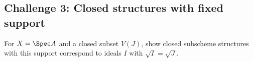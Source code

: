 \subsection*{Challenge 3: Closed structures with fixed support}
\begin{problem}\label{chal:vi22-03}
For $X=\Spec A$ and a closed subset $V(J)$, show closed subscheme structures with this support correspond to ideals $I$ with $\sqrt I=\sqrt J$.
\end{problem}
